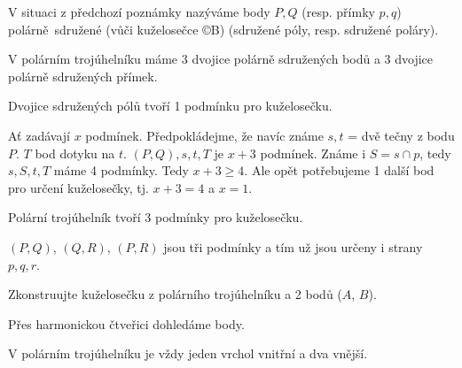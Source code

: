 \documentclass[12pt]{article}					%
\begin{document}
\begin{definice}
	V situaci z předchozí poznámky nazýváme body $P, Q$ (resp. přímky $p, q$) polárně sdružené (vůči kuželosečce ©B) (sdružené póly, resp. sdružené poláry).

	\begin{poznamkain}
		V polárním trojúhelníku máme 3 dvojice polárně sdružených bodů a 3 dvojice polárně sdružených přímek.
	\end{poznamkain}
\end{definice}

\begin{veta}
	Dvojice sdružených pólů tvoří 1 podmínku pro kuželosečku.

	\begin{dukazin}
		Ať zadávají $x$ podmínek. Předpokládejme, že navíc známe $s, t$ = dvě tečny z bodu $P$. $T$ bod dotyku na $t$. $(P, Q), s, t, T$ je $x + 3$ podmínek. Známe i $S = s \cap p$, tedy $s, S, t, T$ máme 4 podmínky. Tedy $x + 3 ≥ 4$. Ale opět potřebujeme 1 další bod pro určení kuželosečky, tj. $x + 3 = 4$ a $x = 1$.
	\end{dukazin}
\end{veta}

\begin{veta}
	Polární trojúhelník tvoří 3 podmínky pro kuželosečku.

	\begin{dukazin}
		$(P, Q)$, $(Q, R)$, $(P, R)$ jsou tři podmínky a tím už jsou určeny i strany $p, q, r$.
	\end{dukazin}
\end{veta}

\begin{priklad}[Konstrukce]
	Zkonstruujte kuželosečku z polárního trojúhelníku a 2 bodů ($A$, $B$).

	\begin{reseni}
		Přes harmonickou čtveřici dohledáme body.
	\end{reseni}
\end{priklad}

\begin{poznamka}
	V polárním trojúhelníku je vždy jeden vrchol vnitřní a dva vnější.
\end{poznamka}
\end{document}
